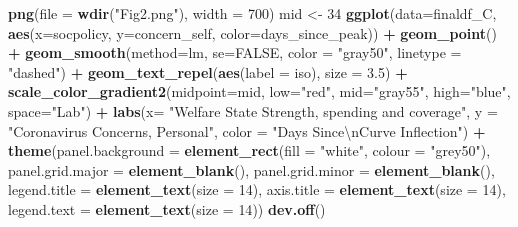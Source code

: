 \documentclass[
]{article}
\newenvironment{Shaded}{\begin{snugshade}}{\end{snugshade}}
\newcommand{\CharTok}[1]{\textcolor[rgb]{0.31,0.60,0.02}{#1}}
\newcommand{\DataTypeTok}[1]{\textcolor[rgb]{0.13,0.29,0.53}{#1}}
\newcommand{\DecValTok}[1]{\textcolor[rgb]{0.00,0.00,0.81}{#1}}
\newcommand{\FloatTok}[1]{\textcolor[rgb]{0.00,0.00,0.81}{#1}}
\newcommand{\KeywordTok}[1]{\textcolor[rgb]{0.13,0.29,0.53}{\textbf{#1}}}
\newcommand{\NormalTok}[1]{#1}
\newcommand{\OperatorTok}[1]{\textcolor[rgb]{0.81,0.36,0.00}{\textbf{#1}}}
\newcommand{\OtherTok}[1]{\textcolor[rgb]{0.56,0.35,0.01}{#1}}
\newcommand{\StringTok}[1]{\textcolor[rgb]{0.31,0.60,0.02}{#1}}
\begin{document}
\begin{Shaded}
\begin{Highlighting}[]
\KeywordTok{png}\NormalTok{(}\DataTypeTok{file =} \KeywordTok{wdir}\NormalTok{(}\StringTok{"Fig2.png"}\NormalTok{), }\DataTypeTok{width =} \DecValTok{700}\NormalTok{)}
\NormalTok{mid <-}\StringTok{ }\DecValTok{34}
\KeywordTok{ggplot}\NormalTok{(}\DataTypeTok{data=}\NormalTok{finaldf_C, }\KeywordTok{aes}\NormalTok{(}\DataTypeTok{x=}\NormalTok{socpolicy, }\DataTypeTok{y=}\NormalTok{concern_self, }\DataTypeTok{color=}\NormalTok{days_since_peak)) }\OperatorTok{+}
\StringTok{  }\KeywordTok{geom_point}\NormalTok{() }\OperatorTok{+}
\StringTok{  }\KeywordTok{geom_smooth}\NormalTok{(}\DataTypeTok{method=}\NormalTok{lm, }\DataTypeTok{se=}\OtherTok{FALSE}\NormalTok{, }\DataTypeTok{color =} \StringTok{"gray50"}\NormalTok{, }\DataTypeTok{linetype =} \StringTok{"dashed"}\NormalTok{) }\OperatorTok{+}
\StringTok{  }\KeywordTok{geom_text_repel}\NormalTok{(}\KeywordTok{aes}\NormalTok{(}\DataTypeTok{label =}\NormalTok{ iso), }\DataTypeTok{size =} \FloatTok{3.5}\NormalTok{) }\OperatorTok{+}
\StringTok{  }\KeywordTok{scale_color_gradient2}\NormalTok{(}\DataTypeTok{midpoint=}\NormalTok{mid, }\DataTypeTok{low=}\StringTok{"red"}\NormalTok{, }\DataTypeTok{mid=}\StringTok{"gray55"}\NormalTok{, }\DataTypeTok{high=}\StringTok{"blue"}\NormalTok{, }\DataTypeTok{space=}\StringTok{"Lab"}\NormalTok{) }\OperatorTok{+}
\StringTok{  }\KeywordTok{labs}\NormalTok{(}\DataTypeTok{x=} \StringTok{"Welfare State Strength, spending and coverage"}\NormalTok{, }\DataTypeTok{y =} \StringTok{"Coronavirus Concerns, Personal"}\NormalTok{, }\DataTypeTok{color =} \StringTok{"Days Since}\CharTok{\textbackslash{}n}\StringTok{Curve Inflection"}\NormalTok{) }\OperatorTok{+}
\StringTok{      }\KeywordTok{theme}\NormalTok{(}\DataTypeTok{panel.background =} \KeywordTok{element_rect}\NormalTok{(}\DataTypeTok{fill =} \StringTok{"white"}\NormalTok{, }\DataTypeTok{colour =} \StringTok{"grey50"}\NormalTok{),}
        \DataTypeTok{panel.grid.major =} \KeywordTok{element_blank}\NormalTok{(),}
        \DataTypeTok{panel.grid.minor =} \KeywordTok{element_blank}\NormalTok{(),}
        \DataTypeTok{legend.title =} \KeywordTok{element_text}\NormalTok{(}\DataTypeTok{size =} \DecValTok{14}\NormalTok{),}
        \DataTypeTok{axis.title =} \KeywordTok{element_text}\NormalTok{(}\DataTypeTok{size =} \DecValTok{14}\NormalTok{),}
        \DataTypeTok{legend.text =} \KeywordTok{element_text}\NormalTok{(}\DataTypeTok{size =} \DecValTok{14}\NormalTok{))}
\KeywordTok{dev.off}\NormalTok{()}
\end{Highlighting}
\end{Shaded}
\end{document}
